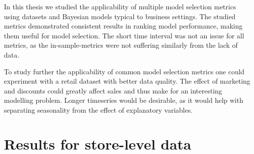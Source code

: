 \documentclass[english, 12pt, a4paper, sci, utf8, a-1b, online]{aaltothesis}
\begin{document}

In this thesis we studied the applicability of multiple model selection metrics using datasets and Bayesian models typical to business settings. The studied metrics demonstrated consistent results in ranking model performance, making them useful for model selection. The short time interval was not an issue for all metrics, as the in-sample-metrics were not suffering similarly from the lack of data.

To study further the applicability of common model selection metrics one could experiment with a retail dataset with better data quality. The effect of marketing and discounts could greatly affect sales and thus make for an interesting modelling problem. Longer timeseries would be desirable, as it would help with separating seasonality from the effect of explanatory variables.

 





\clearpage




\clearpage
\thesisappendix

\section{Results for store-level data\label{app:single_store_results}}
\end{document}
